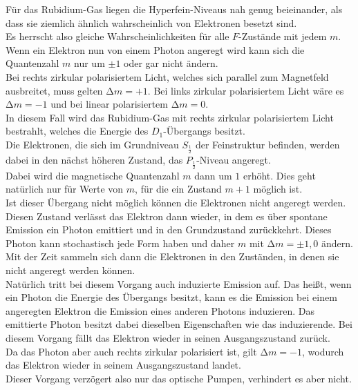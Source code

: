 \noindent
Für das Rubidium-Gas liegen die Hyperfein-Niveaus nah genug beieinander, als dass sie ziemlich ähnlich wahrscheinlich von Elektronen besetzt sind.\\
Es herrscht also gleiche Wahrscheinlichkeiten für alle $F$-Zustände mit jedem $m$.\\
Wenn ein Elektron nun von einem Photon angeregt wird kann sich die Quantenzahl $m$ nur um $\pm 1$ oder gar nicht ändern.\\
Bei rechts zirkular polarisiertem Licht, welches sich parallel zum Magnetfeld ausbreitet, muss gelten $\increment m = +1$. 
Bei links zirkular polarisiertem Licht wäre es $\increment m = -1$ und bei linear polarisiertem $\increment m = 0$.\\
In diesem Fall wird das Rubidium-Gas mit rechts zirkular polarisiertem Licht bestrahlt, welches die Energie des $D_1$-Übergangs besitzt.\\
Die Elektronen, die sich im Grundniveau $S_{\frac{1}{2}}$ der Feinstruktur befinden, werden dabei in den nächst höheren Zustand, 
das $P_{\frac{1}{2}}$-Niveau angeregt.\\
Dabei wird die magnetische Quantenzahl $m$ dann um $1$ erhöht. 
Dies geht natürlich nur für Werte von $m$, für die ein Zustand $m+1$ möglich ist.\\
Ist dieser Übergang nicht möglich können die Elektronen nicht angeregt werden.\\
Diesen Zustand verlässt das Elektron dann wieder, in dem es über spontane Emission ein Photon emittiert und in den Grundzustand zurückkehrt.
Dieses Photon kann stochastisch jede Form haben und daher $m$ mit $\increment m = \pm 1,0$ ändern.\\
Mit der Zeit sammeln sich dann die Elektronen in den Zuständen, in denen sie nicht angeregt werden können.\\
Natürlich tritt bei diesem Vorgang auch induzierte Emission auf.
Das heißt, wenn ein Photon die Energie des Übergangs besitzt, kann es die Emission bei einem angeregten Elektron die Emission eines anderen Photons induzieren.
Das emittierte Photon besitzt dabei dieselben Eigenschaften wie das induzierende. Bei diesem Vorgang fällt das Elektron wieder in seinen Ausgangszustand zurück.\\
Da das Photon aber auch rechts zirkular polarisiert ist, gilt $\increment m = -1$, wodurch das Elektron wieder in seinem Ausgangszustand landet.\\
Dieser Vorgang verzögert also nur das optische Pumpen, verhindert es aber nicht.


